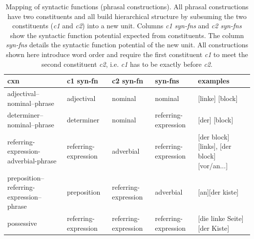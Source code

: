 \begin{table}
\begin{centering}
\begin{tabular}{| p{2.0cm} || p{1.8cm} || p{1.8cm}  || p{1.8cm}  || p{2.3cm} |}
\hline
cxn &  c1 syn-fn & c2 syn-fn & syn-fns & examples \\ \hline\hline
adjectival--nominal--phrase  &adjectival & nominal & nominal & [linke] [block] 
 \\ \hline  
determiner--nominal--phrase  &determiner & nominal & referring-expression & [der] [block] 
\\ \hline 
referring-expression-adverbial-phrase  &referring-expression & adverbial & referring-expression & [der block] [links], [der block] [vor/an...] 
\\ \hline  
preposition--referring-expression--phrase  &preposition & referring-expression & adverbial & [an][der kiste] 
\\ \hline  
possessive  &referring-expression & referring-expression & referring-expression & [die linke Seite] [der Kiste] 
\\ \hline
\end{tabular}
\caption[Mapping of syntactic functions]{Mapping of syntactic functions (phrasal constructions). All phrasal
constructions have two constituents and all build hierarchical structure by subsuming the two constituents (\emph{c1} and 
\emph{c2}) into a new unit. 
Columns \emph{c1 syn-fns} and \emph{c2 syn-fns} show the syntactic function potential expected from constituents.
The column \emph{syn-fns} details the syntactic function potential of the new unit. All constructions shown here
introduce word order and require the first constituent \emph{c1} to meet the second
constituent \emph{c2}, i.e. \emph{c1} has to be exactly before \emph{c2}.}
\label{t:phrasal-syn}
\end{centering}
\end{table}

